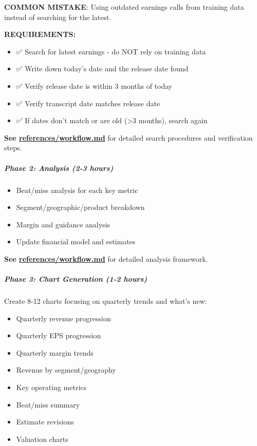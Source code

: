 \documentclass[11pt]{article}
\begin{document}
\textbf{COMMON MISTAKE}: Using outdated earnings calls from training data instead of searching for the latest.


\textbf{REQUIREMENTS:}

\begin{itemize}[leftmargin=*,itemsep=2pt,topsep=2pt]
\item {} ✅ Search for latest earnings - do NOT rely on training data
\item {} ✅ Write down today's date and the release date found
\item {} ✅ Verify release date is within 3 months of today
\item {} ✅ Verify transcript date matches release date
\item {} ✅ If dates don't match or are old (>3 months), search again
\end{itemize}

\textbf{See \href{references/workflow.md}{references/workflow.md}} for detailed search procedures and verification steps.


\subparagraph{Phase 2: Analysis (2-3 hours)}\mbox{}\par
\begin{itemize}[leftmargin=*,itemsep=2pt,topsep=2pt]
\item {} Beat/miss analysis for each key metric
\item {} Segment/geographic/product breakdown
\item {} Margin and guidance analysis
\item {} Update financial model and estimates
\end{itemize}

\textbf{See \href{references/workflow.md}{references/workflow.md}} for detailed analysis framework.


\subparagraph{Phase 3: Chart Generation (1-2 hours)}\mbox{}\par
Create 8-12 charts focusing on quarterly trends and what's new:

\begin{itemize}[leftmargin=*,itemsep=2pt,topsep=2pt]
\item {} Quarterly revenue progression
\item {} Quarterly EPS progression
\item {} Quarterly margin trends
\item {} Revenue by segment/geography
\item {} Key operating metrics
\item {} Beat/miss summary
\item {} Estimate revisions
\item {} Valuation charts
\end{itemize}
\end{document}
